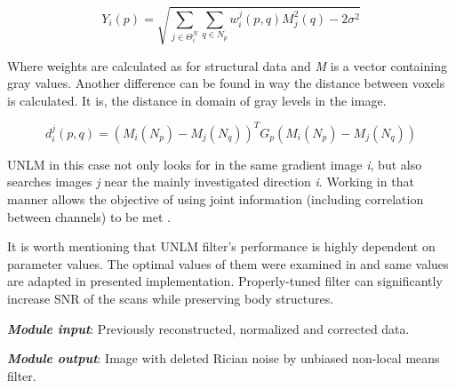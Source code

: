 \begin{equation}
Y_i(p) = \sqrt{\sum_{j \in \Theta_{i}^{N}}^{}\sum_{q \in N_p}^{} w_i^j(p,q)M_j^2(q)-2\sigma^2}
\end{equation}

Where weights are calculated as for structural data and \textit{M} is a vector containing gray values. Another difference can be found in way the distance between voxels is calculated. It is, the distance in domain of gray levels in the image. 

\begin{equation}
d_{i}^{j}(p,q) = (M_i(N_p)-M_j(N_q))^TG_p(M_i(N_p)-M_j(N_q))
\label{m5e7}
\end{equation}

UNLM in this case not only looks for in the same gradient image \textit{i}, but also searches images \textit{j} near the mainly investigated direction \textit{i}. Working in that manner allows the objective of using joint information (including correlation between channels) to be met \cite{5a2}.



It is worth mentioning that UNLM filter's performance is highly dependent on parameter values. The optimal values of them were examined in \cite{5a1} and same values are adapted in presented implementation. Properly-tuned filter can significantly increase SNR of the scans while preserving body structures.


\emph{\textbf{Module input}}: Previously reconstructed, normalized and corrected data.

\emph{\textbf{Module output}}: Image with deleted Rician noise by unbiased non-local means filter. \\